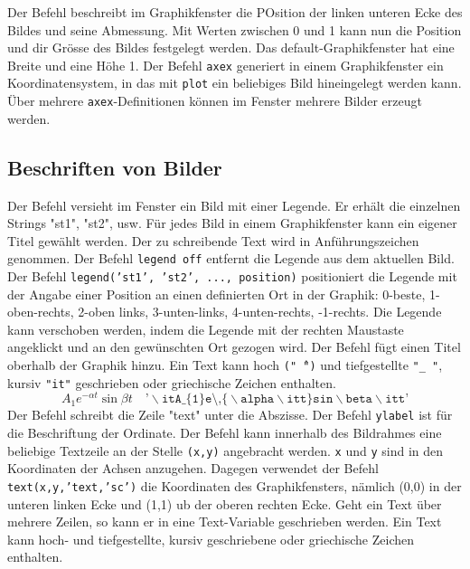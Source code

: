 \newline\newline
Der Befehl  beschreibt im Graphikfenster die POsition der linken unteren Ecke des Bildes und seine Abmessung. Mit Werten zwischen 0 und 1 kann nun die Position und dir Grösse des Bildes festgelegt werden. Das default-Graphikfenster hat eine Breite und eine Höhe 1. Der Befehl {\color{red}\texttt{axex}} generiert in einem Graphikfenster ein Koordinatensystem, in das mit {\color{red}\texttt{plot}} ein beliebiges Bild hineingelegt werden kann. Über mehrere {\color{red}\texttt{axex}}-Definitionen können im Fenster mehrere Bilder erzeugt werden.
\subsection{Beschriften von Bilder} 
Der Befehl  versieht im Fenster ein Bild mit einer Legende. Er erhält die einzelnen Strings "st1", "st2", usw. Für jedes Bild in einem Graphikfenster kann ein eigener Titel gewählt werden. Der zu schreibende Text wird in Anführungszeichen genommen. Der Befehl {\color{red}\texttt{legend off}} entfernt die Legende aus dem aktuellen Bild. Der Befehl {\color{red}\texttt{legend('st1', 'st2', ..., position)}} positioniert die Legende mit der Angabe einer Position an einen definierten Ort in der Graphik: 0-beste, 1-oben-rechts, 2-oben links, 3-unten-links, 4-unten-rechts, -1-rechts. Die Legende kann verschoben werden, indem die Legende mit der rechten Maustaste angeklickt und an den gewünschten Ort gezogen wird.
\newline\newline
Der Befehl  fügt einen Titel oberhalb der Graphik hinzu. Ein Text kann hoch \texttt{("\^\,")} und tiefgestellte \texttt{"\_\,"}, kursiv \texttt{"it"} geschrieben oder griechische Zeichen enthalten. 
\begin{equation}
\boxed{A_1e^{-\alpha t}\sin \beta t\quad \texttt{'$\backslash$itA\_\{1\}e\^\,\{$\backslash$alpha$\backslash$itt\}sin$\backslash$beta$\backslash$itt'}}
\end{equation}
Der Befehl  schreibt die Zeile "text" unter die Abszisse. Der Befehl \texttt{ylabel} ist für die Beschriftung der Ordinate.
\newline\newline
Der Befehl  kann innerhalb des Bildrahmes eine beliebige Textzeile an der Stelle \texttt{(x,y)} angebracht werden. \texttt{x} und \texttt{y} sind in den Koordinaten der Achsen anzugehen. Dagegen verwendet der Befehl {\color{red}\texttt{text(x,y,'text,'sc')}} die Koordinaten des Graphikfensters, nämlich (0,0) in der unteren linken Ecke und (1,1) ub der oberen rechten Ecke. Geht ein Text über mehrere Zeilen, so kann er in eine Text-Variable geschrieben werden. Ein Text kann hoch- und tiefgestellte, kursiv geschriebene oder griechische Zeichen enthalten.
